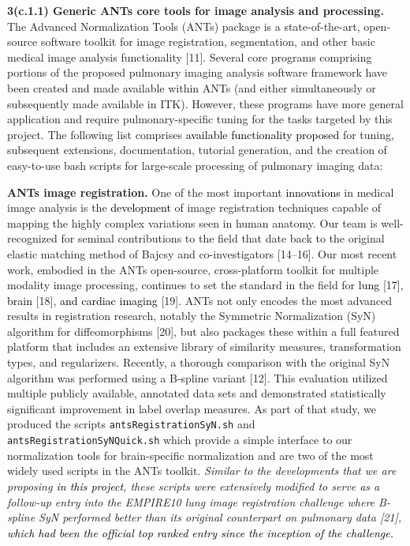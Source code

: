 \documentclass[11pt,]{article}
\begin{document}


\textbf{3(c.1.1) Generic ANTs core tools for image analysis and
processing.} The Advanced Normalization Tools (ANTs) package is a
state-of-the-art, open-source software toolkit for image registration,
segmentation, and other basic medical image analysis functionality
{[}11{]}. Several core programs comprising portions of the proposed
pulmonary imaging analysis software framework have been created and made
available within ANTs (and either simultaneously or subsequently made
available in ITK). However, these programs have more general application
and require pulmonary-specific tuning for the tasks targeted by this
project. The following list comprises
\textcolor{black}{available functionality proposed} for tuning,
subsequent extensions, documentation, tutorial generation, and the
creation of easy-to-use bash scripts for large-scale processing of
pulmonary imaging data:

\textbf{ANTs image registration.} One of the most important
\textcolor{black}{innovations} in medical image analysis is the
\textcolor{black}{development} of image registration techniques capable
of mapping the highly complex variations seen in human anatomy. Our team
is well-recognized for seminal contributions to the field that date back
to the original elastic matching method of Bajcsy and co-investigators
{[}14--16{]}. Our most recent work, embodied in the ANTs open-source,
cross-platform toolkit for multiple modality image processing, continues
to set the standard in the field for \textcolor{black}{lung} {[}17{]},
\textcolor{black}{brain} {[}18{]}, \textcolor{black}{
and cardiac imaging} {[}19{]}. ANTs not only encodes the most advanced
results in registration research, notably the Symmetric Normalization
(SyN) algorithm for diffeomorphisms {[}20{]}, but also packages these
within a full featured platform that includes an extensive library of
similarity measures, transformation types, and regularizers. Recently, a
thorough comparison with the original SyN algorithm was performed using
a B-spline variant {[}12{]}. This evaluation utilized multiple publicly
available, annotated data sets and demonstrated statistically
significant improvement in label overlap measures. As part of that
study, we produced the scripts \texttt{antsRegistrationSyN.sh} and
\texttt{antsRegistrationSyNQuick.sh} which provide a simple interface to
our normalization tools for brain-specific normalization and are two of
the most widely used scripts in the ANTs toolkit. \emph{Similar to the
developments that we are proposing \textcolor{black}{in this project},
these scripts were extensively modified to serve as a follow-up entry
into the EMPIRE10 lung image registration challenge where B-spline SyN
performed better than its original counterpart on pulmonary data
{[}21{]},
\textcolor{black}{which had been the official top ranked entry since the inception of the challenge.}}
\end{document}
